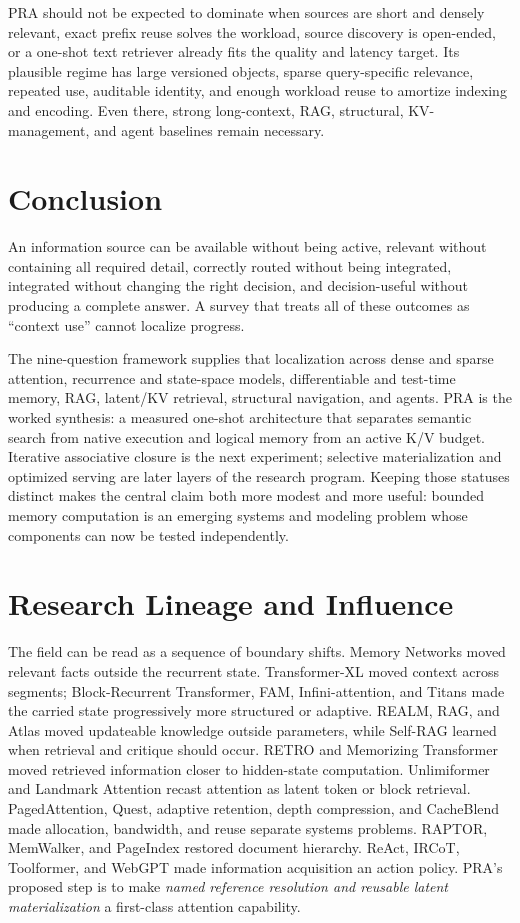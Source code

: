 \documentclass[10pt,a4paper]{article}
\begin{document}
PRA should not be expected to dominate when sources are short and densely relevant, exact
prefix reuse solves the workload, source discovery is open-ended, or a one-shot text retriever
already fits the quality and latency target. Its plausible regime has large versioned objects,
sparse query-specific relevance, repeated use, auditable identity, and enough workload reuse to
amortize indexing and encoding. Even there, strong long-context, RAG, structural, KV-management,
and agent baselines remain necessary.

\section{Conclusion}

An information source can be available without being active, relevant without containing all
required detail, correctly routed without being integrated, integrated without changing the
right decision, and decision-useful without producing a complete answer. A survey that treats
all of these outcomes as ``context use'' cannot localize progress.

The nine-question framework supplies that localization across dense and sparse attention,
recurrence and state-space models, differentiable and test-time memory, RAG, latent/KV
retrieval, structural navigation, and agents. PRA is the worked synthesis: a measured one-shot
architecture that separates semantic search from native execution and logical memory from an
active K/V budget. Iterative associative closure is the next experiment; selective
materialization and optimized serving are later layers of the research program. Keeping those
statuses distinct makes the central claim both more modest and more useful: bounded memory
computation is an emerging systems and modeling problem whose components can now be tested
independently.

\iffalse
\section{Research Lineage and Influence}
The field can be read as a sequence of boundary shifts. Memory Networks moved relevant facts outside the recurrent state. Transformer-XL moved context across segments; Block-Recurrent Transformer, FAM, Infini-attention, and Titans made the carried state progressively more structured or adaptive. REALM, RAG, and Atlas moved updateable knowledge outside parameters, while Self-RAG learned when retrieval and critique should occur. RETRO and Memorizing Transformer moved retrieved information closer to hidden-state computation. Unlimiformer and Landmark Attention recast attention as latent token or block retrieval. PagedAttention, Quest, adaptive retention, depth compression, and CacheBlend made allocation, bandwidth, and reuse separate systems problems. RAPTOR, MemWalker, and PageIndex restored document hierarchy. ReAct, IRCoT, Toolformer, and WebGPT made information acquisition an action policy. PRA's proposed step is to make \emph{named reference resolution and reusable latent materialization} a first-class attention capability.
\end{document}
